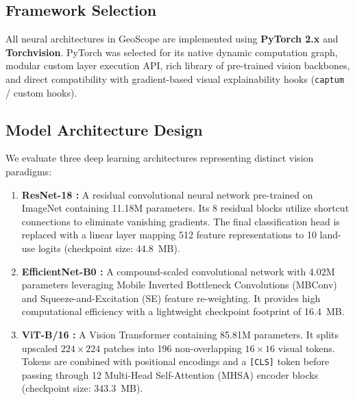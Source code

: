 \documentclass[11pt,a4paper]{article}
\begin{document}
\subsection{Framework Selection}
All neural architectures in GeoScope are implemented using \textbf{PyTorch 2.x} and \textbf{Torchvision}. PyTorch was selected for its native dynamic computation graph, modular custom layer execution API, rich library of pre-trained vision backbones, and direct compatibility with gradient-based visual explainability hooks (\texttt{captum} / custom hooks).

\subsection{Model Architecture Design}
We evaluate three deep learning architectures representing distinct vision paradigms:

\begin{enumerate}[nosep]
  \item \textbf{ResNet-18 \cite{he2016}:} A residual convolutional neural network pre-trained on ImageNet containing 11.18M parameters. Its 8 residual blocks utilize shortcut connections to eliminate vanishing gradients. The final classification head is replaced with a linear layer mapping 512 feature representations to 10 land-use logits (checkpoint size: 44.8~MB).
  \item \textbf{EfficientNet-B0 \cite{tan2019}:} A compound-scaled convolutional network with 4.02M parameters leveraging Mobile Inverted Bottleneck Convolutions (MBConv) and Squeeze-and-Excitation (SE) feature re-weighting. It provides high computational efficiency with a lightweight checkpoint footprint of 16.4~MB.
  \item \textbf{ViT-B/16 \cite{dosovitskiy2021}:} A Vision Transformer containing 85.81M parameters. It splits upscaled $224\times224$ patches into 196 non-overlapping $16\times16$ visual tokens. Tokens are combined with positional encodings and a \texttt{[CLS]} token before passing through 12 Multi-Head Self-Attention (MHSA) encoder blocks (checkpoint size: 343.3~MB).
\end{enumerate}
\end{document}
